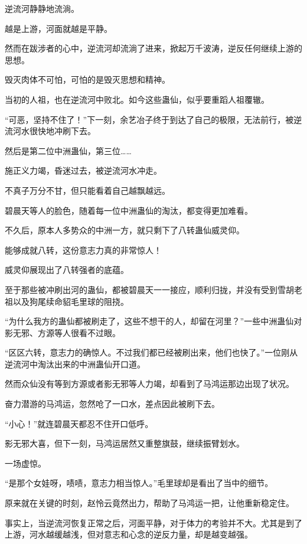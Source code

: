 
\begin{this_body}

逆流河静静地流淌。

越是上游，河面就越是平静。

然而在跋涉者的心中，逆流河却流淌了进来，掀起万千波涛，逆反任何继续上游的思想。

毁灭肉体不可怕，可怕的是毁灭思想和精神。

当初的人祖，也在逆流河中败北。如今这些蛊仙，似乎要重蹈人祖覆辙。

“可恶，坚持不住了！”下一刻，余艺冶子终于到达了自己的极限，无法前行，被逆流河水很快地冲刷下去。

然后是第二位中洲蛊仙，第三位……

施正义力竭，昏迷过去，被逆流河水冲走。

不真子万分不甘，但只能看着自己越飘越远。

碧晨天等人的脸色，随着每一位中洲蛊仙的淘汰，都变得更加难看。

不久后，原本人多势众的中洲一方，就只剩下了八转蛊仙威灵仰。

能够成就八转，这份意志力真的非常惊人！

威灵仰展现出了八转强者的底蕴。

至于那些被冲刷出河的蛊仙，都被碧晨天一一接应，顺利归拢，并没有受到雪胡老祖以及狗尾续命貂毛里球的阻挠。

“为什么我方的蛊仙都被刷走了，这些不想干的人，却留在河里？”一些中洲蛊仙对影无邪、方源等人很看不过眼。

“区区六转，意志力的确惊人。不过我们都已经被刷出来，他们也快了。”一位刚从逆流河中淘汰出来的中洲蛊仙开口道。

然而众仙没有等到方源或者影无邪等人力竭，却看到了马鸿运那边出现了状况。

奋力潜游的马鸿运，忽然呛了一口水，差点因此被刷下去。

“小心！”就连碧晨天都忍不住开口低呼。

影无邪大喜，但下一刻，马鸿运居然又重整旗鼓，继续振臂划水。

一场虚惊。

“是那个女娃呀，啧啧，意志力相当惊人。”毛里球却是看出了当中的细节。

原来就在关键的时刻，赵怜云竟然出力，帮助了马鸿运一把，让他重新稳定住。

事实上，当逆流河恢复正常之后，河面平静，对于体力的考验并不大。尤其是到了上游，河水越缓越浅，但对意志和心念的逆反力量，却是越变越强。


\end{this_body}
